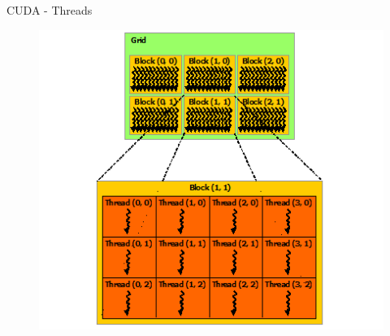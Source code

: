 \documentclass{beamer}
\begin{document}
\begin{frame}{CUDA - Threads}
  \begin{figure}
      \centering
      
      \includegraphics[height=0.7\textheight]{Images/grid-of-thread-blocks.png}
   
    \end{figure}
\end{frame}
\end{document}

